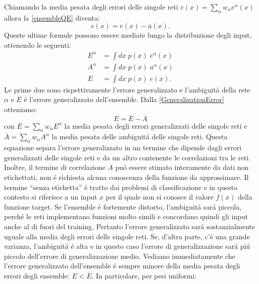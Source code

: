 \documentclass[a4paper,10pt]{article}
\begin{document}
  Chiamando la media pesata degli errori delle singole reti $\overline{e}\left(x\right) = \sum_{\alpha} w_{\alpha} e^{\alpha}\left(x\right)$ allora la \ref{ensembleQE} diventa:
  \begin{equation}
   e\left(x\right) = \overline{e}\left(x\right) - \overline{a}\left(x\right). \label{GeneralizationError}
  \end{equation}
  Queste ultime formule possono essere mediate lungo la distribuzione degli input, ottenendo le seguenti:
  \begin{align}
   E^{\alpha} &= \int dx \; p\left(x\right) \; e^{\alpha}\left(x\right) \\
   A^{\alpha} &= \int dx \; p\left(x\right) \; a^{\alpha}\left(x\right) \\
   E &= \int dx \; p\left(x\right) \; e\left(x\right).
  \end{align}
  Le prime due sono rispettivamente l'errore generalizzato e l'ambiguit\'a della rete $\alpha$ e $E$ \'e l'errore generalizzato dell'ensemble. Dalla \ref{GeneralizationError} otteniamo:
  \begin{equation}
   E = \overline{E} - \overline{A} \label{EnsembleGeneralizationError}
  \end{equation}
  con $\overline{E} = \sum_{\alpha} w_{\alpha} E^{\alpha}$ la media pesata degli errori generalizzati delle singole reti e $\overline{A} = \sum_{\alpha} w_{\alpha} A^{\alpha}$ la media pesata delle ambiguit\'a delle singole reti.
  Questa equazione separa l'errore generalizzato in un termine che dipende dagli errori generalizzati delle singole reti e da un altro contenente le correlazioni tra le reti. Inoltre, il termine di correlazione $A$ pu\'o essere stimato interamente da dati non etichettati, non \'e richiesta alcuna conoscenza della funzione da approssimare. Il termine ``senza etichetta'' \'e tratto dai problemi di classificazione e in questo contesto si riferisce a un input $x$ per il quale non si conosce il valore $f(x)$ della funzione target. 
  Se l'ensemble \'e fortemente distorto, l'ambiguit\'a sar\'a piccola, perch\'e le reti implementano funzioni molto simili e concordano quindi gli input anche al di fuori del training. Pertanto l'errore generalizzato sar\'a sostanzialmente uguale alla media degli errori delle singole reti. Se, d'altra parte, c'\'e una grande varianza, l'ambiguit\'a \'e alta e in questo caso l'errore di generalizzazione sar\'a pi\'u piccolo dell'errore di generalizzazione medio.
  Vediamo immediatamente che l'errore generalizzato dell'ensemble \'e sempre minore della media pesata degli errori degli ensemble: $E < \overline{E}$. In particolare, per pesi uniformi:
\end{document}
